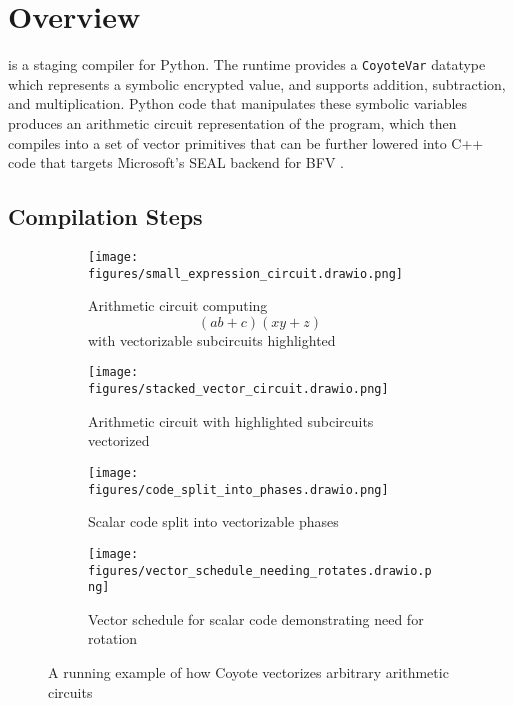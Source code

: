 \section{\system Overview}\label{sec:overview}
\system is a staging compiler for Python.
The runtime provides a \texttt{CoyoteVar} datatype which represents a symbolic encrypted value, and supports addition, subtraction, and multiplication.
Python code that manipulates these symbolic variables produces an arithmetic circuit representation of the program, which \system then compiles into a set of vector primitives that can be further lowered into C++ code that targets Microsoft's SEAL backend for BFV .


 
\subsection*{Compilation Steps}
\begin{figure}
    \begin{subfigure}{0.45\columnwidth}
        \texttt{[image: figures/small\_expression\_circuit.drawio.png]}
        \caption{Arithmetic circuit computing $$(ab+c)(xy+z)$$ with vectorizable subcircuits highlighted}
        \label{fig:small-expr-circuit}
    \end{subfigure}
    \begin{subfigure}{0.45\columnwidth}
        \texttt{[image: figures/stacked\_vector\_circuit.drawio.png]}
        \caption{Arithmetic circuit with highlighted subcircuits vectorized}
        \label{fig:partially-vectorized-circuit}
    \end{subfigure}
    \begin{subfigure}{0.3\columnwidth}
        \texttt{[image: figures/code\_split\_into\_phases.drawio.png]}
        \caption{Scalar code split into vectorizable phases}
        \label{fig:code-split-phases}
    \end{subfigure}
    \begin{subfigure}{0.6\columnwidth}
        \texttt{[image: figures/vector\_schedule\_needing\_rotates.drawio.png]}
        \caption{Vector schedule for scalar code demonstrating need for rotation}
        \label{fig:vector-sched-needing-rotates}
    \end{subfigure}
    \caption{A running example of how Coyote vectorizes arbitrary arithmetic circuits}
    \label{fig:toy-running-example}
\end{figure}

